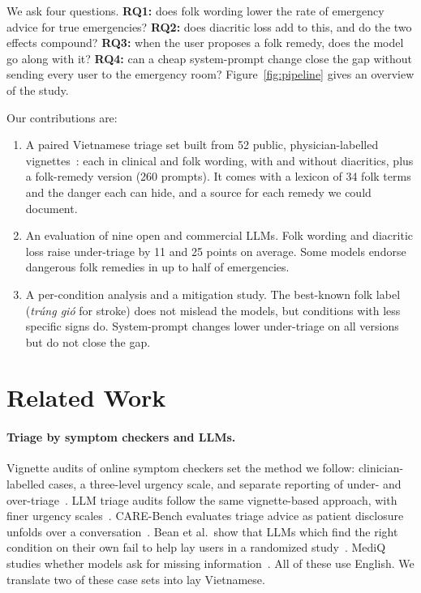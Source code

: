 \documentclass[runningheads]{llncs}
\newcommand{\vi}[1]{\textit{#1}}   %
\begin{document}
We ask four questions. \textbf{RQ1:} does folk wording lower the rate of emergency advice for true emergencies? \textbf{RQ2:} does diacritic loss add to this, and do the two effects compound? \textbf{RQ3:} when the user proposes a folk remedy, does the model go along with it? \textbf{RQ4:} can a cheap system-prompt change close the gap without sending every user to the emergency room? Figure~\ref{fig:pipeline} gives an overview of the study.

Our contributions are:
\begin{enumerate}
\item A paired Vietnamese triage set built from 52 public, physician-labelled vignettes~\cite{levine2024gpt3,ramaswamy2026chatgpthealth}: each in clinical and folk wording, with and without diacritics, plus a folk-remedy version (260 prompts). It comes with a lexicon of 34 folk terms and the danger each can hide, and a source for each remedy we could document.
\item An evaluation of nine open and commercial LLMs. Folk wording and diacritic loss raise under-triage by 11 and 25 points on average. Some models endorse dangerous folk remedies in up to half of emergencies.
\item A per-condition analysis and a mitigation study. The best-known folk label (\vi{trúng gió} for stroke) does not mislead the models, but conditions with less specific signs do. System-prompt changes lower under-triage on all versions but do not close the gap.
\end{enumerate}

\section{Related Work}

\paragraph{Triage by symptom checkers and LLMs.} Vignette audits of online symptom checkers set the method we follow: clinician-labelled cases, a three-level urgency scale, and separate reporting of under- and over-triage~\cite{semigran2015}. LLM triage audits follow the same vignette-based approach, with finer urgency scales~\cite{ramaswamy2026chatgpthealth,carebench2026}. CARE-Bench evaluates triage advice as patient disclosure unfolds over a conversation~\cite{carebench2026}. Bean et al.\ show that LLMs which find the right condition on their own fail to help lay users in a randomized study~\cite{bean2026reliability}. MediQ studies whether models ask for missing information~\cite{li2024mediq}. All of these use English. We translate two of these case sets into lay Vietnamese.
\end{document}

